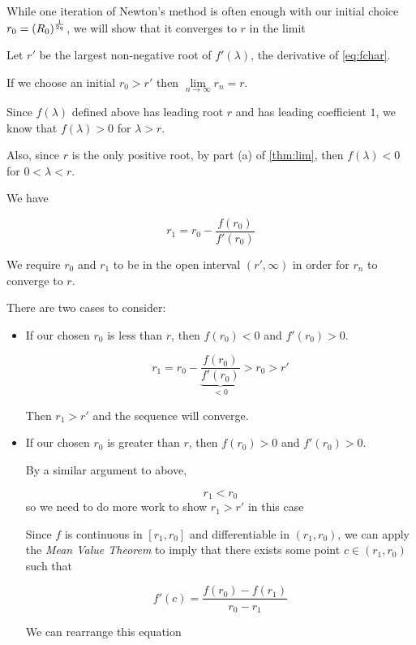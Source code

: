 While one iteration of Newton's method is often enough with our initial choice $r_0=\left(R_0\right)^{\frac1{2q}}$, we will show that it converges to $r$ in the limit

\begin{lemma}
Let $r'$ be the largest non-negative root of $f'(\lambda)$, the derivative of \ref{eq:fchar}. 

If we choose an initial $r_0 > r'$ then $\lim\limits_{n\to\infty} r_n = r$.

\begin{pf}
Since $f(\lambda)$ defined above has leading root $r$ and has leading coefficient $1$, we know that $f(\lambda)>0$ for $\lambda>r$.

Also, since $r$ is the only positive root, by part (a) of \ref{thm:lim}, then $f(\lambda)<0$ for $0<\lambda<r$.

We have 

\begin{equation}\label{eq:r1newton}
r_1 = r_0 - \frac{f(r_0)}{f'(r_0)}
\end{equation}

We require $r_0$ and $r_1$ to be in the open interval $(r',\infty)$ in order for $r_n$ to converge to $r$.

There are two cases to consider:

\begin{itemize}
\item  If our chosen $r_0$ is less than $r$, then $f(r_0)<0$ and $f'(r_0)>0$.

$$r_1 = r_0 - \underbrace{\frac{f(r_0)}{f'(r_0)}}_{<0} > r_0 > r'$$


Then $r_1>r'$ and the sequence will converge.

\item   If our chosen $r_0$ is greater than $r$, then $f(r_0)>0$ and $f'(r_0)>0$.

By a similar argument to above, 

$$r_1 < r_0$$ so we need to do more work to show $r_1 > r'$ in this case

Since $f$ is continuous in $[r_1,r_0]$ and differentiable in $(r_1,r_0)$, we can apply the \textit{Mean Value Theorem} to imply that there exists some point $c\in (r_1,r_0)$ such that 

\begin{equation}
f'(c)=\frac{f(r_0)-f(r_1)}{r_0-r_1}
\end{equation}

We can rearrange this equation


\end{itemize}
\end{pf}
\end{lemma}
